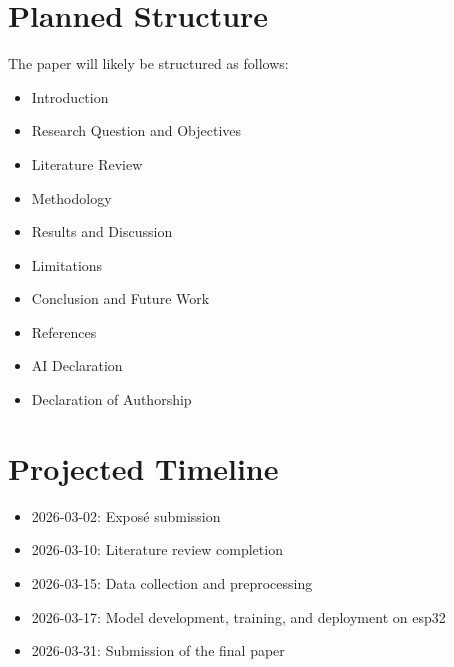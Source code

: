 \documentclass[12pt,a4paper,twoside,open=any]{scrreprt}
\begin{document}
\section*{Planned Structure}
The paper will likely be structured as follows:
\begin{itemize}
    \item Introduction
    \item Research Question and Objectives
    \item Literature Review
    \item Methodology
    \item Results and Discussion
    \item Limitations
    \item Conclusion and Future Work
    \item References
    \item AI Declaration
    \item Declaration of Authorship
\end{itemize}

\section*{Projected Timeline}
\begin{itemize}
    \item 2026-03-02: Expos\'e submission
    \item 2026-03-10: Literature review completion
    \item 2026-03-15: Data collection and preprocessing
    \item 2026-03-17: Model development, training, and deployment on \gls{esp32}
    \item 2026-03-31: Submission of the final paper
\end{itemize}

\clearpage

\nocite{*}
\printbibliography
\end{document}
